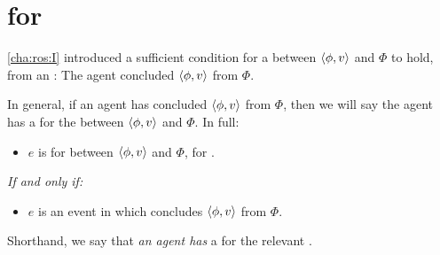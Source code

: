 \section{ for }
\label{cha:ros:W}

\begin{note}
  \autoref{cha:ros:I} introduced a sufficient condition for a \ros{} between \(\langle \phi, v \rangle\) and \(\Phi\) to hold, from an \agpe{}:
  The agent concluded \(\langle \phi, v \rangle\) from \(\Phi\).

  In general, if an agent has concluded \(\langle \phi, v \rangle\) from \(\Phi\), then we will say the agent has a \wit{} for the \ros{} between \(\langle \phi, v \rangle\) and \(\Phi\).
  In full:

  \begin{definition}
    \label{def:witnessing}

    \begin{itemize}
    \item
      \(e\) is \emph{} for \ros{} between \(\langle \phi, v \rangle\) and \(\Phi\), for \vAgent{}.
    \end{itemize}

    \emph{If and only if:}

    \begin{itemize}
    \item
      \(e\) is an event in which \vAgent{} concludes \(\langle \phi, v \rangle\) from \(\Phi\).
    \end{itemize}
    \vspace{-\baselineskip}
  \end{definition}

  Shorthand, we say that \emph{an agent has} a  for the relevant \ros{}.
\end{note}

